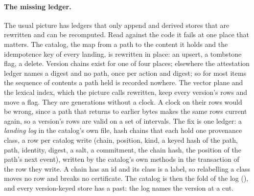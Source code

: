 \documentclass[11pt]{article}
\theoremstyle{plain}
\theoremstyle{definition}
\begin{document}
\paragraph{The missing ledger.}
The usual picture has ledgers that only append and derived stores that are rewritten and can be
recomputed. Read against the code it fails at one place that matters. The catalog, the map from a
path to the content it holds and the idempotence key of every landing, is rewritten in place: an
upsert, a tombstone flag, a delete. Version chains exist for one of four places; elsewhere the
attestation ledger names a digest and no path, once per action and digest; so for most items the
sequence of contents a path held is recorded nowhere. The vector plane and the lexical index, which
the picture calls rewritten, keep every version's rows and move a flag. They are generations
without a clock. A clock on their rows would be wrong, since a path that returns to earlier bytes
makes the same rows current again, so a version's rows are valid on a set of intervals. The fix
is one ledger: a \emph{landing log} in the catalog's own file, hash chains that each hold one
provenance class, a row per catalog write (chain, position, kind, a keyed hash of the path, path,
identity, digest, a salt, a commitment, the chain hash, the position of the path's next event),
written by the catalog's own methods in the transaction of the row they write. A chain has an id
and its class is a label, so relabelling a class moves no row and breaks no certificate. The
catalog is then the fold of the log (), and every version-keyed store has a
past: the log names the version at a cut.
\end{document}
